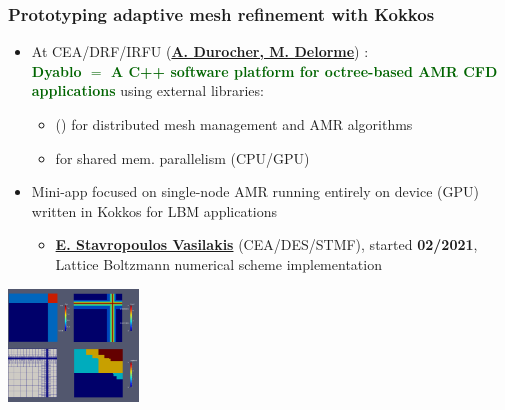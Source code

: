 \begin{frame}[fragile=singleslide]
  \frametitle{Prototyping adaptive mesh refinement with Kokkos}

  \begin{minipage}{0.52\linewidth}
     \begin{itemize}
     \item At CEA/DRF/IRFU ({\bf \underline{A. Durocher, M. Delorme}}) :\\
        \textcolor{darkgreen}{\bf Dyablo $=$ A C++ software platform for octree-based AMR CFD applications} using external libraries:
    \begin{itemize}
    \item () for distributed mesh management and AMR algorithms
    \item {} for shared mem. parallelism (CPU/GPU)
    \end{itemize}
  \item Mini-app focused on single-node AMR running entirely on device (GPU) written in Kokkos for LBM applications
     \begin{itemize}
     \item \underline{\bf E. Stavropoulos Vasilakis} (CEA/DES/STMF), started {\bf 02/2021}, Lattice Boltzmann numerical scheme implementation
     \end{itemize}
  \end{itemize}
  \end{minipage}
  \begin{minipage}{0.47\linewidth}
    \begin{center}
      \includegraphics[height=3.0cm]{./images/canop/piecewise_const_prob3/piecewise_const_prob3_t0p0}\vspace{0.3cm}


\end{center}
\end{minipage}
\end{frame}
